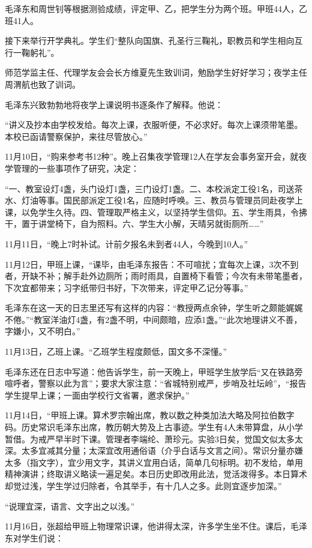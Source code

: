 \documentclass[../../dazhuan.tex]{subfiles}
\begin{document}
毛泽东和周世钊等根据测验成绩，评定甲、乙，把学生分为两个班。甲班44人，乙班41人。

接下来举行开学典礼。学生们“整队向国旗、孔圣行三鞠礼，职教员和学生相向互行一鞠躬礼”。

师范学监主任、代理学友会会长方维夏先生致训词，勉励学生好好学习；夜学主任周渭航也致了训词。

毛泽东兴致勃勃地将夜学上课说明书逐条作了解释。他说：

“讲义及抄本由学校发给。每次上课，衣服听便，不必求好。每次上课须带笔墨。本校已函请警察保护，来往尽管放心。”

11月10日，“购来参考书12种”。晚上召集夜学管理12人在学友会事务室开会，就夜学管理的一些事项作了研究，决定：

“一、教室设灯4盏，头门设灯1盏，三门设灯1盏。二、本校派定工役1名，司送茶水、灯油等事。国民部派定工役1名，应随时呼唤。三、教员与管理员同赴夜学上课，以免学生久待。四、管理取严格主义，以坚持学生信仰。五、学生雨具，令拂干，置于讲堂椅下，自为照料。六、学生大小解，天晴另就街厕所……”

11月11日，“晚上7时补试。计前夕报名未到者44人，今晚到10人。”

11月12日，甲班上课，“课毕，由毛泽东报告：不可喧扰；宜每次上课，3次不到者，开缺不补；解手赴外边厕所；雨时雨具，自置椅下看管；今次有未带笔墨者，下次宜都带来；习字纸带归书好，下次带来，评定甲乙记分等事。”

毛泽东在这一天的日志里还写有这样的内容：“教授两点余钟，学生听之颇能娓娓不倦。”“教室洋油灯4盏，有2盏不明，中间颇暗，应添1盏。”“此次地理讲义不善，字嫌小，又不明白。”

11月13日，乙班上课。“乙班学生程度颇低，国文多不深懂。”

毛泽东还在日志中写道：他告诉学生，前一天晚上，甲班学生放学后“又在铁路旁喧呼者，警察以此为言”；要求大家注意：“省城特别戒严，步哨及社坛岭”，“报告学生提早上课；一面由学校行文省署，邀求保护。”

11月14日，“甲班上课。算术罗宗翰出席，教以数之种类加法大略及阿拉伯数字码。历史常识毛泽东出席，教历朝大势及上古事迹。学生有4人未带算盘，从小学暂借。为戒严早半时下课。管理者李端纶、萧珍元。实验3日矣，觉国文似太多太深。太多宜减其分量；太深宜改用通俗语（介乎白话与文言之间）。常识分量亦嫌太多（指文字），宜少用文字，其讲义宜用白话，简单几句标明。初不发给，单用精神演讲；终取讲义略读一遍足矣。本日历史即改用此法，觉活泼得多。本日算术却觉过浅，学生学过归除者，令其举手，有十几人之多。此则宜逐步加深。”

“说理宜深，语言、文字出之以浅。”

11月16日，张超给甲班上物理常识课，他讲得太深，许多学生坐不住。课后，毛泽东对学生们说：
\end{document}
